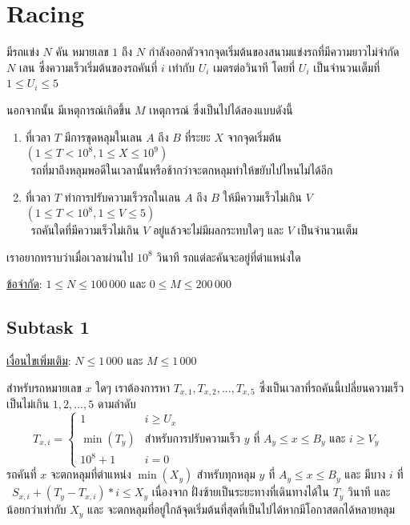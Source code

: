 \documentclass[12pt]{article}
\begin{document}
\section{Racing}

มีรถแข่ง $N$ คัน หมายเลข $1$ ถึง $N$  กำลังออกตัวจากจุดเริ่มต้นของสนามแข่งรถที่มีความยาวไม่จำกัด $N$ เลน ซึ่งความเร็วเริ่มต้นของรถคันที่ $i$ เท่ากับ $U_i$ เมตรต่อวินาที โดยที่ $U_i$ เป็นจำนวนเต็มที่ $1 \leq U_i \leq 5$

นอกจากนั้น มีเหตุการณ์เกิดขึ้น $M$ เหตุการณ์ ซึ่งเป็นไปได้สองแบบดังนี้

\begin{enumerate}
  \item ที่เวลา $T$ มีการขุดหลุมในเลน $A$ ถึง $B$ ที่ระยะ $X$ จากจุดเริ่มต้น $(1 \leq T < 10^8, 1 \leq X \leq 10^9)$\\\
  รถที่มาถึงหลุมพอดีในเวลานั้นหรือช้ากว่าจะตกหลุมทำให้ขยับไปไหนไม่ได้อีก 
  \item ที่เวลา $T$ ทำการปรับความเร็วรถในเลน $A$ ถึง $B$ ให้มีความเร็วไม่เกิน $V$ $(1 \leq T < 10^8, 1 \leq V \leq 5)$ \\\
  รถคันใดที่มีความเร็วไม่เกิน $V$ อยู่แล้วจะไม่มีผลกระทบใดๆ และ $V$ เป็นจำนวนเต็ม
\end{enumerate}

เราอยากทราบว่าเมื่อเวลาผ่านไป $10^8$ วินาที รถแต่ละคันจะอยู่ที่ตำแหน่งใด

\underline{ข้อจำกัด}: $1 \leq N \leq 100\,000$ และ $0 \leq M \leq 200\,000$

\subsection{Subtask 1}

\underline{เงื่อนไขเพิ่มเติม}: $N \leq 1\,000$ และ $M \leq 1\,000$

สำหรับรถหมายเลข $x$ ใดๆ เราต้องการหา $T_{x,1}, T_{x,2}, ..., T_{x,5}$ ซึ่งเป็นเวลาที่รถคันนี้เปลี่ยนความเร็วเป็นไม่เกิน $1, 2, ..., 5$ ดามลำดับ 
$$
T_{x,i} = 
\begin{cases}
  1 
  & i \geq U_x\\
  \min(T_y) 
  & \text{สำหรับการปรับความเร็ว } y \text{ ที่ } A_y \leq x \leq B_y \text{ และ } i \geq V_y \\
  10^8 + 1
  & i = 0
\end{cases}
$$
รถคันที่ $x$ จะตกหลุมที่ตำแหน่ง $\min(X_y)$ สำหรับทุกหลุม $y$ ที่ $A_y \leq x \leq B_y$ และ มีบาง $i$ ที่\\\
$S_{x,i} + (T_y - T_{x,i}) * i \leq X_y$ เนื่องจาก ฝั่งซ้ายเป็นระยะทางที่เดินทางได้ใน $T_y$ วินาที และ น้อยกว่าเท่ากับ $X_y$ และ จะตกหลุมที่อยู่ใกล้จุดเริ่มต้นที่สุดที่เป็นไปได้หากมีโอกาสตกได้หลายหลุม
\end{document}
